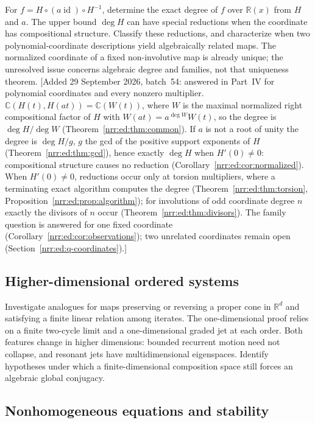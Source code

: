 \documentclass[11pt,letterpaper]{article}
\theoremstyle{definition}
\theoremstyle{remark}
\newcommand{\R}{\mathbb R}
\newcommand{\C}{\mathbb C}
\newcommand{\id}{\operatorname{id}}
\begin{document}
For $f=H\circ(a\id)\circ H^{-1}$, determine the exact degree of
$f$ over $\R(x)$ from $H$ and $a$. The upper bound $\deg H$ can
have special reductions when the coordinate has compositional
structure. Classify these reductions, and characterize when two
polynomial-coordinate descriptions yield algebraically related maps.
The normalized coordinate of a fixed non-involutive map is already
unique; the unresolved issue concerns algebraic degree and families,
not that uniqueness theorem.
[Added 29 September 2026, batch~54: answered in Part~IV for polynomial
coordinates and every nonzero multiplier. $\C(H(t),H(at))=\C(W(t))$, where $W$
is the maximal normalized right compositional factor of $H$ with
$W(at)=a^{\deg W}W(t)$, so the degree is $\deg H/\deg W$
(Theorem~\ref{nrr:ed:thm:common}). If $a$ is not a root of unity the degree is
$\deg H/g$, $g$ the gcd of the positive support exponents of $H$
(Theorem~\ref{nrr:ed:thm:gcd}), hence exactly $\deg H$ when $H'(0)\ne0$:
compositional structure causes no reduction
(Corollary~\ref{nrr:ed:cor:normalized}). When $H'(0)\ne0$, reductions occur
only at torsion multipliers, where a terminating exact algorithm computes the
degree (Theorem~\ref{nrr:ed:thm:torsion},
Proposition~\ref{nrr:ed:prop:algorithm}); for involutions of odd coordinate
degree $n$ exactly the divisors of $n$ occur (Theorem~\ref{nrr:ed:thm:divisors}).
The family question is answered for one fixed coordinate
(Corollary~\ref{nrr:ed:cor:observations}); two unrelated coordinates remain
open (Section~\ref{nrr:ed:q-coordinates}).]

\subsection{Higher-dimensional ordered systems}

Investigate analogues for maps preserving or reversing a proper cone
in $\R^d$ and satisfying a finite linear relation among iterates.
The one-dimensional proof relies on a finite two-cycle limit and a
one-dimensional graded jet at each order. Both features change in
higher dimensions: bounded recurrent motion need not collapse, and
resonant jets have multidimensional eigenspaces. Identify hypotheses
under which a finite-dimensional composition space still forces an
algebraic global conjugacy.

\subsection{Nonhomogeneous equations and stability}
\end{document}
